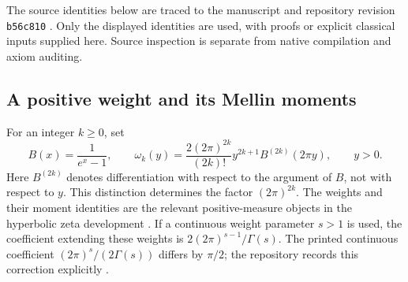 \documentclass[11pt,a4paper]{article}
\numberwithin{equation}{section}
\theoremstyle{definition}
\theoremstyle{remark}
\begin{document}
The source identities below are traced to the manuscript
\cite{hyp-manuscript} and repository revision \texttt{b56c810}
\cite{hyp-weight,hyp-moments,hyp-pole,hyp-gram,hyp-signs}.
Only the displayed identities are used, with proofs or explicit
classical inputs supplied here. Source inspection is separate from
native compilation and axiom auditing.

\subsection{A positive weight and its Mellin moments}

For an integer $k\geq0$, set
\begin{equation}\label{hyp-weight-def}
B(x)=\frac1{e^x-1},\qquad
\omega_k(y)=\frac{2(2\pi)^{2k}}{(2k)!}
y^{2k+1}B^{(2k)}(2\pi y),\qquad y>0.
\end{equation}
Here $B^{(2k)}$ denotes differentiation with respect to the argument of
$B$, not with respect to $y$. This distinction determines the factor
$(2\pi)^{2k}$. The weights and their moment identities are the relevant
positive-measure objects in the hyperbolic zeta development
\cite{hyp-weight,hyp-moments}. If a continuous weight parameter
$s>1$ is used, the coefficient extending these weights is
$2(2\pi)^{s-1}/\Gamma(s)$. The printed continuous coefficient
$(2\pi)^s/(2\Gamma(s))$ differs by $\pi/2$; the repository records
this correction explicitly \cite{hyp-normalization}.
\end{document}
